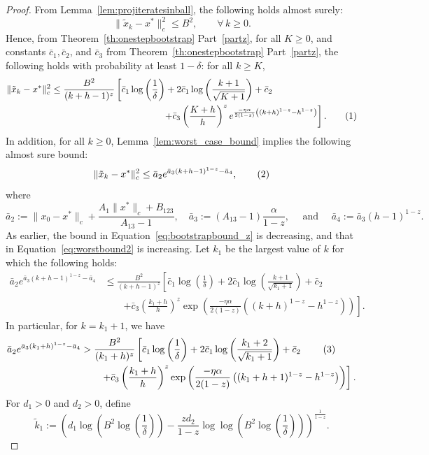 \documentclass{article}
\newcommand{\numberthis}{\addtocounter{equation}{1}\tag{\theequation}}
\newcommand{\lrp}[1]{\left( #1 \right)}
\begin{document}
\begin{proof}
From  Lemma~\ref{lem:projiteratesinball}, the following holds almost surely:
\[\|\tilde{x}_k - x^*\|^2_c \le B^2, \qquad \forall\, k\ge 0. \] 
Hence, from Theorem~\ref{th:onestepbootstrap} Part~\ref{partz}, for all $K\ge 0$, and constants $\bar{c}_1, \bar{c}_2$, and $\bar{c}_3$ from Theorem~\ref{th:onestepbootstrap} Part~\ref{partz}, the following holds with probability at least $1-\delta$: for all $k\ge K$, 
\begin{align*}
    \|\tilde{x}_k - x^*\|^2_c &\le  \frac{B^2}{(k+h-1)^z} \left[ \bar{c}_1\log\lrp{\frac{1}{\delta}} + 2\bar{c}_1\log\lrp{\frac{k+1}{\sqrt{K+1}}} + \bar{c}_2 \right. \\
    &\qquad\qquad\qquad\qquad\qquad\qquad \left. + \bar{c}_3 \lrp{\frac{K+h}{h}}^z e^{\frac{-\eta \alpha}{2(1-z)}\lrp{(k+h)^{1-z} - h^{1-z}}} \right]. \numberthis\label{eq:bootstrapbound_z}
\end{align*}
In addition, for all $k\ge 0$, Lemma~\ref{lem:worst_case_bound} implies the following almost sure bound:
\[ \|\tilde{x}_{k} - x^*\|^2_c \leq \bar{a}_2 e^{\bar{a}_3 \lrp{k + h -1}^{1-z} - \bar{a}_4}, \numberthis\label{eq:worstbound2} \]
where 
\[ 
    \bar{a}_2 := \|x_0 - x^*\|_c + \frac{A_1 \|x^*\|_c + B_{123}}{A_{13}-1}, \quad \bar{a}_3 := (A_{13}- 1)\frac{\alpha}{1-z}, \quad \text{ and } \quad \bar{a}_4 := \bar{a}_3{ (h-1)^{1-z}}.
\]
As earlier, the bound in Equation~\eqref{eq:bootstrapbound_z} is decreasing, and that in Equation~\eqref{eq:worstbound2} is increasing. Let $k_1$ be the largest value of $k$ for which the following holds:
\begin{align*}
    \bar{a}_2 e^{\bar{a}_3 \lrp{k + h -1}^{1-z} - \bar{a}_4} 
    &\leq \frac{B^2}{(k+h-1)^z}\left[ \bar{c}_1\log\lrp{\frac{1}{\delta}} + 2\bar{c}_1\log\lrp{\frac{k+1}{\sqrt{k_1+1}}} + \bar{c}_2  \right.\\
    &\qquad \left. + \bar{c}_3 \lrp{\frac{k_1 + h}{h}}^z \exp\lrp{\frac{-\eta \alpha}{2(1-z)}\lrp{(k+h)^{1-z} - h^{1-z}}} \right].
\end{align*}
In particular, for $k=k_1+1$, we have
\begin{align*}
    \bar{a}_2 e^{\bar{a}_3 \lrp{k_1 + h}^{1-z} - \bar{a}_4} 
    &> \frac{B^2}{(k_1+h)^z}\left[ \bar{c}_1\log\lrp{\frac{1}{\delta}} + 2\bar{c}_1\log\lrp{\frac{k_1+2}{\sqrt{k_1+1}}} + \bar{c}_2 \right. \numberthis\label{eq:boundz_1} \\
    &\qquad \left. + \bar{c}_3 \lrp{\frac{k_1+h}{h}}^z\exp\lrp{\frac{-\eta \alpha}{2(1-z)}\lrp{(k_1+h+1)^{1-z} - h^{1-z}}} \right].
\end{align*}
For $d_1 > 0$ and $d_2 > 0$, define
\[ \tilde{k}_1 := \lrp{d_1 \log\lrp{B^2 \log\left(\frac{1}{\delta}\right)} - 
  \frac{z d_2}{1-z} \log{\log\lrp{B^2 \log\left(\frac{1}{\delta}\right)}}}^\frac{1}{1-z}.\]
  

\end{proof}
\end{document}
